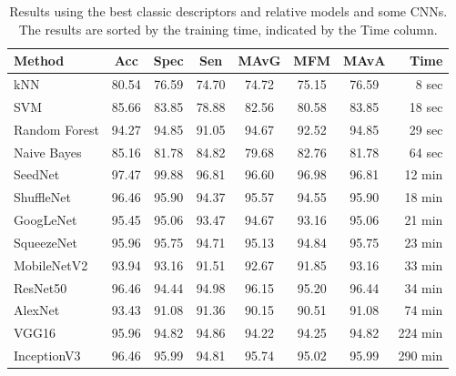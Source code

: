 \documentclass[twocolumn]{svjour3}           %
\begin{document}
\begin{table}[tbhp]
	\centering
	\caption{Results using the best classic descriptors and relative models and some CNNs. The results are sorted by the training time, indicated by the Time column.}
	\label{Table_classification_CNN}
	\begin{tabular}{lccccccr}
		\toprule
		Method    &  Acc  & Spec  &  Sen  & MAvG  &  MFM  & MAvA  & Time\\ \midrule
		kNN & 80.54 & 76.59 & 74.70 & 74.72 & 75.15 & 76.59 & 8 sec \\
		SVM  & 85.66 & 83.85 & 78.88 & 82.56 & 80.58 & 83.85 & 18 sec \\
		Random Forest & 94.27 & 94.85 & 91.05 & 94.67 & 92.52 & 94.85 & 29 sec \\
		Naive Bayes  & 85.16 & 81.78 & 84.82 & 79.68 & 82.76 & 81.78 & 64 sec \\
		SeedNet & 97.47 & 99.88 & 96.81 & 96.60 & 96.98 & 96.81 & 12 min \\
		ShuffleNet & 96.46 & 95.90 & 94.37 & 95.57 & 94.55 & 95.90 & 18 min \\
		GoogLeNet & 95.45 & 95.06 & 93.47 & 94.67 & 93.16 & 95.06 & 21 min \\
		SqueezeNet & 95.96 & 95.75 & 94.71 & 95.13 & 94.84 & 95.75 & 23 min \\
		MobileNetV2 & 93.94 & 93.16 & 91.51 & 92.67 & 91.85 & 93.16 & 33 min \\
		ResNet50 & 96.46 & 94.44 & 94.98 & 96.15 & 95.20 & 96.44 & 34 min \\
		AlexNet & 93.43 & 91.08 & 91.36 & 90.15 & 90.51 & 91.08 & 74 min\\
		VGG16 & 95.96 & 94.82 & 94.86 & 94.22 & 94.25 & 94.82 & 224 min \\
		InceptionV3 & 96.46 & 95.99 & 94.81 & 95.74 & 95.02 & 95.99 & 290 min \\
	 \bottomrule
	\end{tabular}
\end{table}


\end{document}
